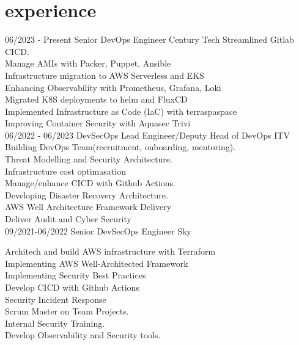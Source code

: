 \documentclass[]{twentysecondcv}
\begin{document}
\section{experience}
\begin{twenty}
  \twentyitem
  {06/2023 - Present}
  {Senior DevOps Engineer}
  {Century Tech}
  {
    Streamlined Gitlab CICD.\\
    Manage AMIs with Packer, Puppet, Ansible\\
    Infrastructure migration to AWS Serverless and EKS\\
    Enhancing Observability with Prometheus, Grafana, Loki\\
    Migrated K8S deployments to helm and FluxCD\\
    Implemented Infrastructure as Code (IaC) with terraspaspace\\
    Improving Container Security with Aquasec Trivi\\
  }
  \twentyitem
  {06/2022 - 06/2023}
  {DevSecOps Lead Engineer/Deputy Head of DevOps}
  {ITV}
  {Building DevOps Team(recruitment, onboarding, mentoring).\\
    Threat Modelling and Security Architecture.\\
    Infrastructure cost optimasation\\
    Manage/enhance CICD with Github Actions.\\
    Developing Disaster Recovery Architecture.\\
    AWS Well Architecture Framework Delivery\\
    Deliver Audit and Cyber Security\\
  }
  \twentyitem
  {09/2021-06/2022}
  {Senior DevSecOps Engineer}
  {Sky}
  {Architech and build AWS infrastructure with Terraform\\
    Implementing AWS Well-Architected Framework\\
    Implementing Security Best Practices\\
    Develop CICD with Github Actions\\
    Security Incident Response\\
    Scrum Master on Team Projects.\\
    Internal Security Training.\\
    Develop Observability and Security tools.

}
\end{twenty}
\end{document}
